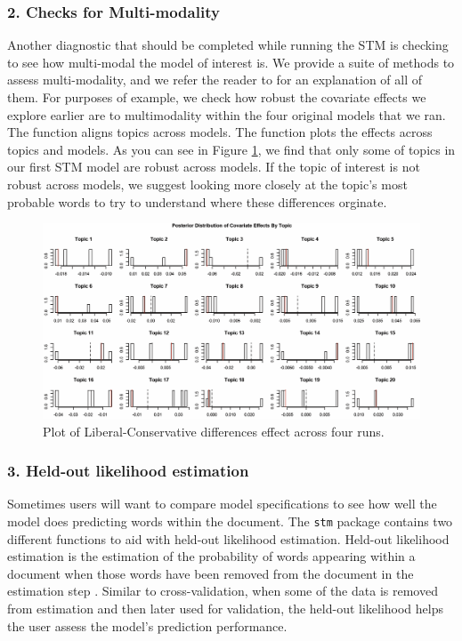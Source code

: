 \documentclass[nojss]{jss}
\begin{document}
\subsubsection{2. Checks for Multi-modality}
Another diagnostic that should be completed while running the STM is checking to see how multi-modal the model of interest is.  We provide a suite of methods to assess multi-modality, and we refer the reader to \citet{robertsnavigating} for an explanation of all of them.  For purposes of example, we check how robust the covariate effects we explore earlier are to multimodality within the four original models that we ran.  The function  aligns topics across models.  The function  plots the effects across topics and models.  As you can see in Figure \ref{fig:multi_poliblog}, we find that only some of topics  in our first STM model are robust across models.  If the topic of interest is not robust across models, we suggest looking more closely at the topic's most probable words to try to understand where these differences orginate.

\begin{figure}
  \centering
  \includegraphics[scale=.45]{multimod.png}
  \caption{Plot of Liberal-Conservative differences effect across four runs.}\label{fig:multi_poliblog}
\end{figure}

\subsubsection{3. Held-out likelihood estimation}
Sometimes users will want to compare model specifications to see how well the model does predicting words within the document.  The \texttt{stm} package contains two different functions to aid with held-out likelihood estimation.  Held-out likelihood estimation is the estimation of the probability of words appearing within a document when those words have been removed from the document in the estimation step \citep{blei2003latent}.  Similar to cross-validation, when some of the data is removed from estimation and then later used for validation, the held-out likelihood helps the user assess the model's prediction performance.
\end{document}
